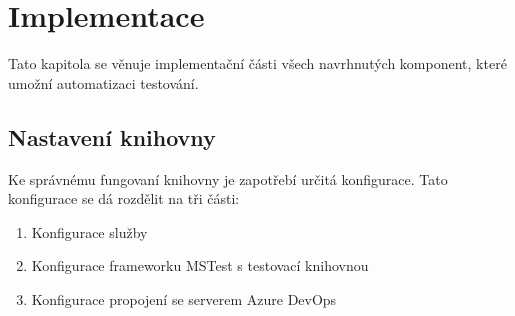 \chapter{Implementace}

Tato kapitola se věnuje implementační části všech navrhnutých komponent, které umožní automatizaci testování.




\section{Nastavení knihovny}
Ke správnému fungovaní knihovny je zapotřebí určitá konfigurace. Tato konfigurace se dá rozdělit na tři části:
\begin{enumerate}
    \item Konfigurace služby
    \item Konfigurace frameworku MSTest s testovací knihovnou
    \item Konfigurace propojení se serverem Azure DevOps
\end{enumerate}

